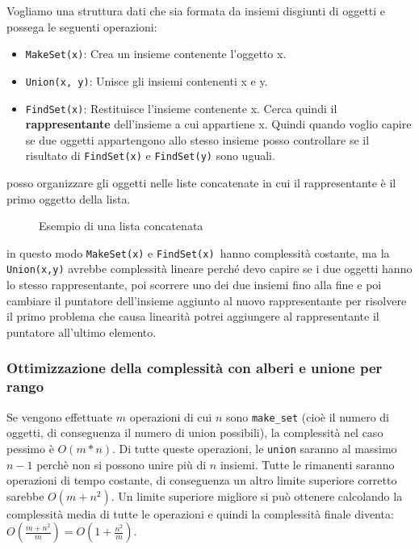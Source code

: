 \documentclass[a4paper]{article}
\begin{document}
Vogliamo una struttura dati che sia formata da insiemi disgiunti di oggetti e possega le seguenti operazioni:
\begin{itemize}
  \item \texttt{MakeSet(x)}: Crea un insieme contenente l'oggetto x.
  \item \texttt{Union(x, y)}: Unisce gli insiemi contenenti x e y.
  \item \texttt{FindSet(x)}: Restituisce l'insieme contenente x. Cerca quindi il \textbf{rappresentante} dell'insieme a cui appartiene x.
  Quindi quando voglio capire se due oggetti appartengono allo stesso insieme posso controllare se il risultato di \texttt{FindSet(x)} e \texttt{FindSet(y)} sono uguali.
\end{itemize}
posso organizzare gli oggetti nelle liste concatenate in cui il rappresentante è il primo oggetto
della lista. 
\begin{figure}[H]
  \centering
  \caption{Esempio di una lista concatenata}
\end{figure}
\noindent
in questo modo \texttt{MakeSet(x)} e \texttt{FindSet(x) }hanno complessità costante, ma la \texttt{Union(x,y)}
avrebbe complessità lineare perché devo capire se i due oggetti hanno lo stesso rappresentante, poi scorrere uno dei due insiemi fino alla fine e poi cambiare
il puntatore dell'insieme aggiunto al nuovo rappresentante per risolvere il primo problema che causa linearità potrei aggiungere al rappresentante il puntatore all'ultimo elemento.
\subsubsection{Ottimizzazione della complessità con alberi e unione per rango}
Se vengono effettuate \( m \) operazioni di cui \( n \) sono \texttt{make\_set} (cioè il numero di oggetti, di conseguenza il numero di union possibili),
la complessità nel caso pessimo è \( O(m*n) \). Di tutte queste operazioni, le
\texttt{union} saranno al massimo \( n-1 \) perchè non si possono unire più di
\( n \) insiemi. Tutte le rimanenti saranno operazioni di tempo costante, di
conseguenza un altro limite superiore corretto sarebbe \( O(m+n^2) \). Un limite
superiore migliore si può ottenere calcolando la complessità media di tutte le operazioni
e quindi la complessità finale diventa: \( O(\frac{m+n^2}{m}) = O(1 + \frac{n^2}{m}) \).
\end{document}
